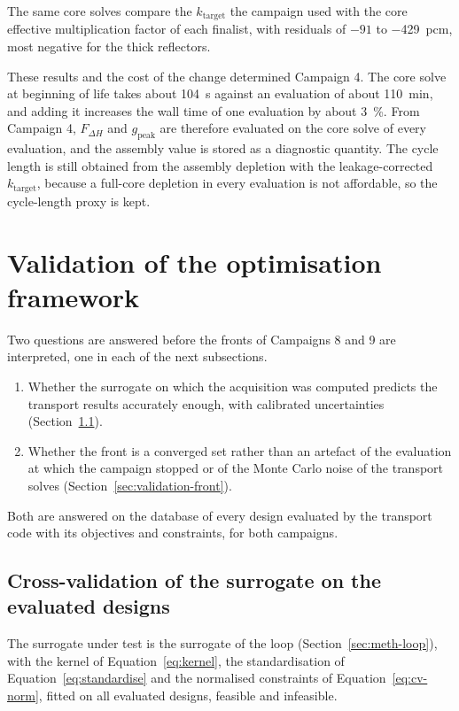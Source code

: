 The same core solves compare the $k_\mathrm{target}$ the campaign
used with the core effective multiplication factor of each finalist,
with residuals of $-91$ to \SI{-429}{pcm}, most negative for the thick
reflectors.

These results and the cost of the change determined Campaign 4. The
core solve at beginning of life takes about \SI{104}{s} against an
evaluation of about \SI{110}{min}, and adding it increases the wall time
of one evaluation by about \SI{3}{\%}. From Campaign 4, $F_{\Delta H}$
and $g_\mathrm{peak}$ are therefore evaluated on the core solve of every
evaluation, and the assembly value is stored as a diagnostic quantity.
The cycle length is still obtained from the assembly depletion with the
leakage-corrected $k_\mathrm{target}$, because a full-core depletion in
every evaluation is not affordable, so the cycle-length proxy is kept.

\section{Validation of the optimisation framework}
\label{sec:validation-framework}

Two questions are answered before the fronts of Campaigns 8 and 9 are
interpreted, one in each of the next subsections.

\begin{enumerate}
  \item Whether the surrogate on which the acquisition was computed
        predicts the transport results accurately enough, with
        calibrated uncertainties
        (Section~\ref{sec:validation-surrogate}).

  \item Whether the front is a converged set rather than an artefact of
        the evaluation at which the campaign stopped or of the Monte
        Carlo noise of the transport solves
                (Section~\ref{sec:validation-front}).
\end{enumerate}

Both are answered on the database of every design evaluated by the
transport code with its objectives and constraints, for both
campaigns.

\subsection{Cross-validation of the surrogate on the evaluated designs}
\label{sec:validation-surrogate}

The surrogate under test is the surrogate of the loop
(Section~\ref{sec:meth-loop}), with the kernel of
Equation~\eqref{eq:kernel}, the standardisation of
Equation~\eqref{eq:standardise} and the normalised constraints of
Equation~\eqref{eq:cv-norm}, fitted on all evaluated designs, feasible
and infeasible.

